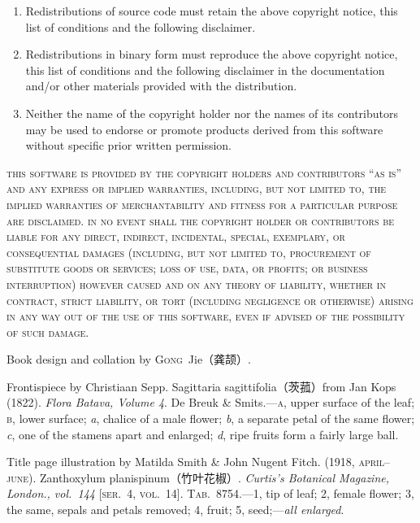\vspace{-.5\baselineskip}
\begin{enumerate}
\item Redistributions of source code must retain the above copyright notice,
      this list of conditions and the following disclaimer.

\item Redistributions in binary form must reproduce the above copyright notice,
      this list of conditions and the following disclaimer in the documentation
      and\slash or other materials provided with the distribution.

\item Neither the name of the copyright holder nor the names of its
      contributors may be used to endorse or promote products derived from
      this software without specific prior written permission.
\end{enumerate}
\vspace{-.5\baselineskip}

\begingroup%
%
\textsc{this software is provided by the copyright holders and contributors
``as is'' and any express or implied warranties, including, but not limited to,
the implied warranties of merchantability and fitness for a particular purpose
are disclaimed. in no event shall the copyright holder or contributors be
liable for any direct, indirect, incidental, special, exemplary, or
consequential damages (including, but not limited to, procurement of
substitute goods or services; loss of use, data, or profits; or business
interruption) however caused and on any theory of liability, whether in
contract, strict liability, or tort (including negligence or otherwise)
arising in any way out of the use of this software, even if advised of the
possibility of such damage.}
\endgroup%
\vspace{-.5\baselineskip}

\vfill

Book design and collation by \textsc{Gong}~Jie\!（龚颉）\!\!\!.

Frontispiece by Christiaan Sepp. Sagittaria sagittifolia\!（茨菰）\!from Jan
Kops (1822). \textit{Flora Batava, Volume 4}. De Breuk \& Smits.---\textsc{a},
upper surface of the leaf; \textsc{b}, lower surface; \textit{a}, chalice of a
male flower; \textit{b}, a separate petal of the same flower; \textit{c}, one
of the stamens apart and enlarged; \textit{d}, ripe fruits form a fairly large
ball.

Title page illustration by Matilda Smith \& John Nugent Fitch. (1918,
\textsc{april--june}). Zanthoxylum planispinum\!（竹叶花椒）\!\!\!.
\textit{Curtis's Botanical Magazine, London., vol.~144} [\textsc{ser}.~4,
\textsc{vol}.~14]. \textsc{Tab}.~8754.---1, tip of leaf; 2, female flower;
3, the same, sepals and petals removed; 4, fruit; 5, seed;---\textit{all
enlarged}.


